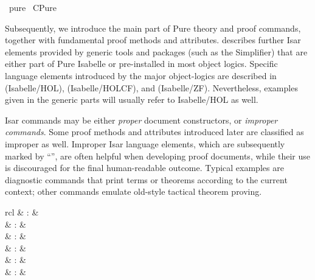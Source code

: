 %
\begin{isabellebody}%
\def\isabellecontext{pure}%
%
\isadelimtheory
\isanewline
\isanewline
%
\endisadelimtheory
%
\isatagtheory
{}\isamarkupfalse%
\ pure\isanewline
{}\ CPure\isanewline
{}%
\endisatagtheory
{\isafoldtheory}%
%
\isadelimtheory
%
\endisadelimtheory
%
\isamarkuptrue%
%
\begin{isamarkuptext}%
Subsequently, we introduce the main part of Pure theory and proof
  commands, together with fundamental proof methods and attributes.
   describes further Isar elements provided by
  generic tools and packages (such as the Simplifier) that are either
  part of Pure Isabelle or pre-installed in most object logics.
  Specific language elements introduced by the major object-logics are
  described in  (Isabelle/HOL), 
  (Isabelle/HOLCF), and  (Isabelle/ZF).  Nevertheless,
  examples given in the generic parts will usually refer to
  Isabelle/HOL as well.

  \medskip Isar commands may be either \emph{proper} document
  constructors, or \emph{improper commands}.  Some proof methods and
  attributes introduced later are classified as improper as well.
  Improper Isar language elements, which are subsequently marked by
  ``\isa{{\isachardoublequote}\isactrlsup {\isacharasterisk}{\isachardoublequote}}'', are often helpful when developing proof
  documents, while their use is discouraged for the final
  human-readable outcome.  Typical examples are diagnostic commands
  that print terms or theorems according to the current context; other
  commands emulate old-style tactical theorem proving.%
\end{isamarkuptext}%
\isamarkuptrue%
%
\isamarkuptrue%
%
\isamarkuptrue%
%
\begin{isamarkuptext}%
\begin{matharray}{rcl}
    \mbox{} & : &  \\
    \mbox{} & : &  \\
    \mbox{} & : &  \\
    \mbox{} & : &  \\
    \mbox{} & : &  \\
    \mbox{} & : &  \\
  \end{matharray}


\end{isamarkuptext}
\end{isabellebody}
